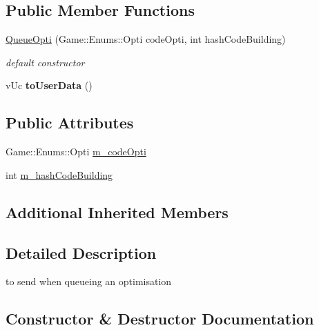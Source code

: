\subsection*{Public Member Functions}
\begin{DoxyCompactItemize}
\item 
\hyperlink{class_network_1_1_messages_1_1_queue_opti_a41fff258fa3eb0ccf755cc3159b972f0}{Queue\+Opti} (Game\+::\+Enums\+::\+Opti code\+Opti, int hash\+Code\+Building)
\begin{DoxyCompactList}\small\item\em default constructor \end{DoxyCompactList}\item 
\mbox{\label{class_network_1_1_messages_1_1_queue_opti_a24cd34c441b0fa1a464fd9d4c21a6880}} 
v\+Uc {\bfseries to\+User\+Data} ()
\end{DoxyCompactItemize}
\subsection*{Public Attributes}
\begin{DoxyCompactItemize}
\item 
Game\+::\+Enums\+::\+Opti \hyperlink{class_network_1_1_messages_1_1_queue_opti_a9c44323cff6ebf7a7bbcfc3c08159c7a}{m\+\_\+code\+Opti}
\item 
int \hyperlink{class_network_1_1_messages_1_1_queue_opti_a7b62a7ace966b1061ca03a288f6ec30c}{m\+\_\+hash\+Code\+Building}
\end{DoxyCompactItemize}
\subsection*{Additional Inherited Members}


\subsection{Detailed Description}
to send when queueing an optimisation 

\subsection{Constructor \& Destructor Documentation}
\mbox{\label{class_network_1_1_messages_1_1_queue_opti_a41fff258fa3eb0ccf755cc3159b972f0}} 
